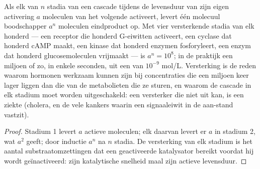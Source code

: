\begin{theorem}\label{thm:b2:cell-signalling:amplification}
Als elk van $n$ stadia van een cascade tijdens de levensduur van zijn eigen
activering $a$ moleculen van het volgende activeert, levert één molecuul
boodschapper $a^{n}$ moleculen eindproduct op. Met vier versterkende stadia
van elk honderd --- een receptor die honderd G-eiwitten activeert, een
cyclase dat honderd cAMP maakt, een kinase dat honderd enzymen fosforyleert,
een enzym dat honderd glucosemoleculen vrijmaakt --- is $a^{n} = 10^{8}$; in
de praktijk een miljoen of zo, in enkele seconden, uit een  van
$10^{-9}$ mol/L. Versterking is de reden waarom hormonen werkzaam kunnen zijn
bij concentraties die een miljoen keer lager liggen dan die van de
metabolieten die ze sturen, en waarom de cascade in elk stadium moet worden
uitgeschakeld: een versterker die niet uit kan, is een ziekte (cholera, en de
vele kankers waarin een signaaleiwit in de aan-stand vastzit).
\end{theorem}
\begin{proof}
Stadium 1 levert $a$ actieve moleculen; elk daarvan levert er $a$
in stadium 2, wat $a^{2}$ geeft; door inductie $a^{n}$ na $n$ stadia.
De versterking van elk stadium is het aantal substraatomzettingen dat een
geactiveerde katalysator bereikt voordat hij wordt geïnactiveerd: zijn
katalytische snelheid maal zijn actieve levensduur.
\end{proof}

